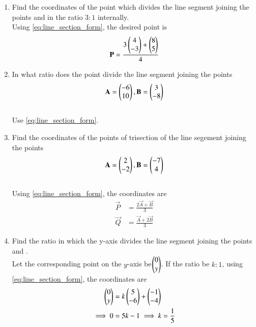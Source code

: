 \begin{enumerate}[label=\arabic*.,ref=\thesubsection.\theenumi]
\item Find the coordinates of the point which divides the line segment joining the points  and  in the ratio $3:1$ internally.
\\
\solution Using \eqref{eq:line_section_form},
the desired point is 
\begin{align}
\mathbf{P} = \frac{3 \begin{pmatrix}4\\-3\end{pmatrix} + \begin{pmatrix}8\\5\end{pmatrix}}{4}
\end{align}
\item In what ratio does the point  divide the line segment joining the points 
%
\begin{align}
\mathbf{A} = \begin{pmatrix}-6\\10\end{pmatrix},
\mathbf{B} = \begin{pmatrix}3\\-8\end{pmatrix}
\end{align}
%
\\
\solution Use \eqref{eq:line_section_form}.
\item Find the coordinates of the points of trisection of the line segement joining the points
%
\begin{align}
\mathbf{A} = \begin{pmatrix}2\\-2\end{pmatrix},
\mathbf{B} = \begin{pmatrix}-7\\4\end{pmatrix}
\end{align}
%
\\
\solution Using \eqref{eq:line_section_form}, the coordinates are
%
\begin{align}
\label{eq:line_section_form_tri}
\vec{P} &= \frac{2 \vec{A} + \vec{B}}{3}
\\
\vec{Q} &= \frac{ \vec{A} + 2\vec{B}}{3}
\end{align}
%

\item Find the ratio in which the y-axis divides the line segment joining the points  and .
\\
\solution Let the corresponding point on the $y$-axis be$\begin{pmatrix}0\\y\end{pmatrix}$. If the ratio be $k:1$,
using \eqref{eq:line_section_form}, the coordinates are
%
\begin{align}
\begin{pmatrix}0\\y\end{pmatrix} &= k\begin{pmatrix}5\\-6\end{pmatrix}+ \begin{pmatrix}-1\\-4\end{pmatrix}
\\
\implies 0 &= 5k-1 \implies k = \frac{1}{5}
\end{align}
%



\end{enumerate}
